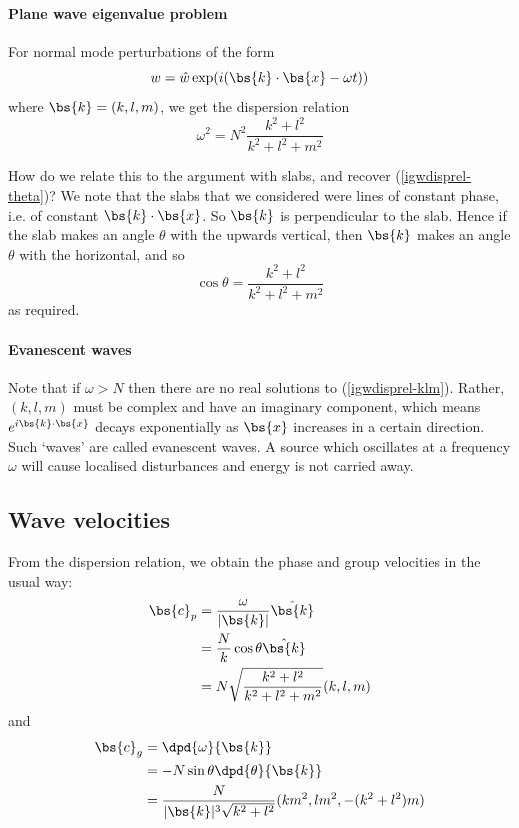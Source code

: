 \paragraph{Plane wave eigenvalue problem}
For normal mode perturbations of the form
\begin{equation}
	w = \hat{w}\exp(i(\bs{k}\cdot\bs{x}-\omega t))
\end{equation}
where $\bs{k} = (k,l,m)$, we get the dispersion relation
\begin{equation}
	\omega^2 = N^2 \frac{k^2+l^2}{k^2+l^2+m^2}
	\label{igwldisprel-klm}
\end{equation}

How do we relate this to the argument with slabs, and recover (\ref{igwdisprel-theta})? We note that the slabs that we considered were lines of constant phase, i.e. of constant $\bs{k}\cdot\bs{x}$. So $\bs{k}$ is perpendicular to the slab. Hence if the slab makes an angle $\theta$ with the upwards vertical, then $\bs{k}$ makes an angle $\theta$ with the horizontal, and so
\begin{equation}
	\cos\theta = \frac{k^2+l^2}{k^2+l^2+m^2}
\end{equation}
as required. 

\paragraph{Evanescent waves}
Note that if $\omega > N$ then there are no real solutions to (\ref{igwdisprel-klm}). Rather, $(k,l,m)$ must be complex and have an imaginary component, which means $e^{i\bs{k}\cdot\bs{x}}$ decays exponentially as $\bs{x}$ increases in a certain direction. Such `waves' are called evanescent waves. A source which oscillates at a frequency $\omega$ will cause localised disturbances and energy is not carried away.

\subsection{Wave velocities}

From the dispersion relation, we obtain the phase and group velocities in the usual way:
\begin{align}
	\bs{c}_p &= \frac{\omega}{|\bs{k}|} \hat{\bs{k}} \\
		&= \frac{N}{k}\cos\theta \hat{\bs{k}} \\
		&= N \sqrt{\frac{k^2+l^2}{k^2+l^2+m^2}} (k,l,m)
\end{align}
and
\begin{align}
	\bs{c}_g &= \dpd{\omega}{\bs{k}} \\
		&= -N \sin\theta \dpd{\theta}{\bs{k}}\\
		&=\frac{N}{|\bs{k}|^3 \sqrt{k^2+l^2}} (km^2,lm^2,-(k^2+l^2)m)
\end{align}

